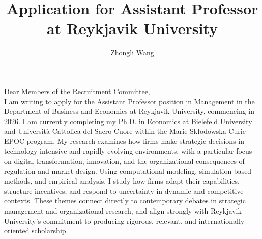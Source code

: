 \documentclass{nfr}
\title{Application for Assistant Professor at Reykjavik University}
\author{Zhongli Wang}
\begin{document}

% 
% 
% 
% 


\maketitle


\noindent Dear Members of the Recruitment Committee,\\[0.2cm]

I am writing to apply for the Assistant Professor position in Management in the Department of Business and Economics at Reykjavik University, commencing in 2026.
I am currently completing my Ph.D. in Economics at Bielefeld University and Università Cattolica del Sacro Cuore within the Marie Skłodowska-Curie EPOC program. 
My research examines how firms make strategic decisions in technology-intensive and rapidly evolving environments, with a particular focus on digital transformation, innovation, and the organizational consequences of regulation and market design. 
Using computational modeling, simulation-based methods, and empirical analysis, I study how firms adapt their capabilities, structure incentives, and respond to uncertainty in dynamic and competitive contexts. 
These themes connect directly to contemporary debates in strategic management and organizational research, and align strongly with Reykjavik University’s commitment to producing rigorous, relevant, and internationally oriented scholarship.\\
\end{document}
